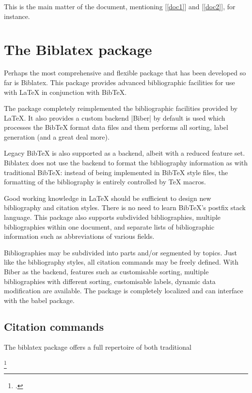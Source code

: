 \begin{refsection}
This is the main matter of the document, mentioning
[\ref{doc1}] and [\ref{doc2}], for instance.

\section{The Biblatex package}

Perhaps the most comprehensive and flexible package that has been developed so far is Biblatex.
This package provides advanced bibliographic facilities for use with LaTeX in conjunction
with BibTeX. 

The package completely reimplemented  the bibliographic
facilities provided by LaTeX. It also provides a  custom backend |Biber| by default is used which processes
the BibTeX format data files and them performs all sorting, label generation
(and a great deal more). 

Legacy BibTeX is also supported as a backend, albeit with a
reduced feature set. Biblatex does not use the backend to format the bibliography
information as with traditional BibTeX: instead of being implemented in BibTeX
style files, the formatting of the bibliography is entirely controlled by TeX macros.

Good working knowledge in LaTeX should be sufficient to design new bibliography
and citation styles. There is no need to learn BibTeX’s postfix stack language. This
package also supports subdivided bibliographies, multiple bibliographies within
one document, and separate lists of bibliographic information such as abbreviations
of various fields. 

Bibliographies may be subdivided into parts and/or segmented
by topics. Just like the bibliography styles, all citation commands may be freely
defined. With Biber as the backend, features such as customisable sorting, multiple
bibliographies with different sorting, customisable labels, dynamic data modification
are available. The package is completely localized and can interface with the babel
package. 

\subsection{Citation commands}

The biblatex package offers a full repertoire of both traditional 

\cite{Bringhurst2005}

\parencite{Bringhurst2005}

\footcite{Bringhurst2005}


\end{refsection}
